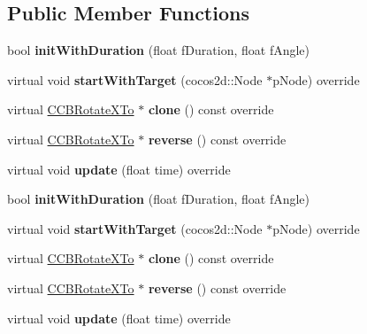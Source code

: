 \subsection*{Public Member Functions}
\begin{DoxyCompactItemize}
\item 
\mbox{\label{classcocosbuilder_1_1CCBRotateXTo_a446892fae43de49ff9c57bd34b0acd16}} 
bool {\bfseries init\+With\+Duration} (float f\+Duration, float f\+Angle)
\item 
\mbox{\label{classcocosbuilder_1_1CCBRotateXTo_ab37ad9982f759cb70bd05cc51a1f0fad}} 
virtual void {\bfseries start\+With\+Target} (cocos2d\+::\+Node $\ast$p\+Node) override
\item 
\mbox{\label{classcocosbuilder_1_1CCBRotateXTo_a79ed02020f919f8e560227bd3275888c}} 
virtual \hyperlink{classcocosbuilder_1_1CCBRotateXTo}{C\+C\+B\+Rotate\+X\+To} $\ast$ {\bfseries clone} () const override
\item 
\mbox{\label{classcocosbuilder_1_1CCBRotateXTo_a3468c63d9934622858bdedcd2d43cdf0}} 
virtual \hyperlink{classcocosbuilder_1_1CCBRotateXTo}{C\+C\+B\+Rotate\+X\+To} $\ast$ {\bfseries reverse} () const override
\item 
\mbox{\label{classcocosbuilder_1_1CCBRotateXTo_a1c03d314004043562d3866c95218b33a}} 
virtual void {\bfseries update} (float time) override
\item 
\mbox{\label{classcocosbuilder_1_1CCBRotateXTo_a446892fae43de49ff9c57bd34b0acd16}} 
bool {\bfseries init\+With\+Duration} (float f\+Duration, float f\+Angle)
\item 
\mbox{\label{classcocosbuilder_1_1CCBRotateXTo_aaf8346cb45192618e0eee9ae46a29dae}} 
virtual void {\bfseries start\+With\+Target} (cocos2d\+::\+Node $\ast$p\+Node) override
\item 
\mbox{\label{classcocosbuilder_1_1CCBRotateXTo_a10c718599e9d1e6ed5822f22de666b4f}} 
virtual \hyperlink{classcocosbuilder_1_1CCBRotateXTo}{C\+C\+B\+Rotate\+X\+To} $\ast$ {\bfseries clone} () const override
\item 
\mbox{\label{classcocosbuilder_1_1CCBRotateXTo_aeb3d453c74e425a72f00fde0111ab3da}} 
virtual \hyperlink{classcocosbuilder_1_1CCBRotateXTo}{C\+C\+B\+Rotate\+X\+To} $\ast$ {\bfseries reverse} () const override
\item 
\mbox{\label{classcocosbuilder_1_1CCBRotateXTo_ac067ad308bc8a3043591638e75e8375d}} 
virtual void {\bfseries update} (float time) override
\end{DoxyCompactItemize}
